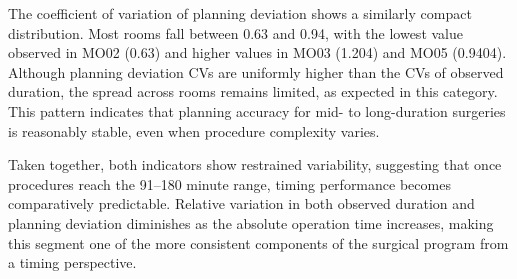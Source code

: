 \documentclass[
]{article}
\begin{document}
The coefficient of variation of planning deviation shows a similarly
compact distribution. Most rooms fall between 0.63 and 0.94, with the
lowest value observed in MO02 (0.63) and higher values in MO03 (1.204)
and MO05 (0.9404). Although planning deviation CVs are uniformly higher
than the CVs of observed duration, the spread across rooms remains
limited, as expected in this category. This pattern indicates that
planning accuracy for mid- to long-duration surgeries is reasonably
stable, even when procedure complexity varies.

Taken together, both indicators show restrained variability, suggesting
that once procedures reach the 91--180 minute range, timing performance
becomes comparatively predictable. Relative variation in both observed
duration and planning deviation diminishes as the absolute operation
time increases, making this segment one of the more consistent
components of the surgical program from a timing perspective.
\end{document}

